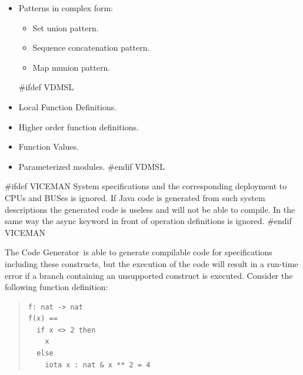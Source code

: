 \documentclass[\pformat,11pt]{article}
\newcommand{\keyw}[1]{{\sf #1}}
\newcommand{\tcg}{the Code Generator}
\newcommand{\Tcg}{The Code Generator}
\begin{document}
\begin{itemize}
As an example the following expression is supported by \tcg :

\begin{quote}
\begin{verbatim}
let x in set numbers in x
\end{verbatim}
\end{quote}

whereas the following is not (caused by the type bind \verb+n: nat+):

\begin{quote}
\begin{verbatim}
let x: nat in x
\end{verbatim}
\end{quote}

\item Patterns in complex form: 

  \begin{itemize}
  \item Set union pattern.
  \item Sequence concatenation pattern.
  \item Map munion pattern.
  \end{itemize}

#ifdef VDMSL
\item Local Function Definitions.

\item Higher order function definitions.
  
\item Function Values. 

\item Parameterized modules.
#endif VDMSL
\end{itemize}

#ifdef VICEMAN
System specifications and the corresponding deployment to CPUs and
BUSes is ignored. If Java code is generated from such system
descriptions the generated code is useless and will not be able to
compile. In the same way the \keyw{async} keyword in front of
operation definitions is ignored.
#endif VICEMAN

\Tcg\ is able to generate compilable code for
specifications including these constructs, but the execution of the
code will result in a run-time error if a branch containing an
unsupported construct is executed. Consider the following function
definition:

\begin{quote}
\begin{verbatim}
f: nat -> nat
f(x) ==
  if x <> 2 then
    x
  else
    iota x : nat & x ** 2 = 4
\end{verbatim}
\end{quote}
\end{document}
